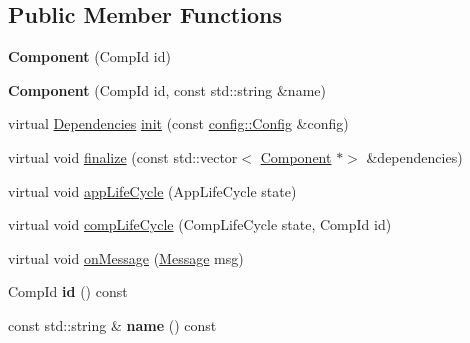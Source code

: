 \subsection*{Public Member Functions}
\begin{DoxyCompactItemize}
\item 
\mbox{\label{classtheoria_1_1core_1_1Component_a64b1e60585ad8c0d12d9be814b37dda8}} 
{\bfseries Component} (Comp\+Id id)
\item 
\mbox{\label{classtheoria_1_1core_1_1Component_a719767a45a12a3d12670aadd83f5d292}} 
{\bfseries Component} (Comp\+Id id, const std\+::string \&name)
\item 
virtual \hyperlink{classtheoria_1_1core_1_1Dependencies}{Dependencies} \hyperlink{classtheoria_1_1core_1_1Component_a7ed45f6e38442a40666ae4556f794f7d}{init} (const \hyperlink{classtheoria_1_1config_1_1Config}{config\+::\+Config} \&config)
\item 
virtual void \hyperlink{classtheoria_1_1core_1_1Component_afd8acc89e2cd36e92bebe7e6fa530764}{finalize} (const std\+::vector$<$ \hyperlink{classtheoria_1_1core_1_1Component}{Component} $\ast$$>$ \&dependencies)
\item 
virtual void \hyperlink{classtheoria_1_1core_1_1Component_ae036cde9b803a621149efeff7e0e00fc}{app\+Life\+Cycle} (App\+Life\+Cycle state)
\item 
virtual void \hyperlink{classtheoria_1_1core_1_1Component_a92578e2b6253681a21b91e7c22b22975}{comp\+Life\+Cycle} (Comp\+Life\+Cycle state, Comp\+Id id)
\item 
virtual void \hyperlink{classtheoria_1_1core_1_1Component_a94991dc5bdf509df6d35bb218e4880eb}{on\+Message} (\hyperlink{classtheoria_1_1core_1_1Message}{Message} msg)
\item 
\mbox{\label{classtheoria_1_1core_1_1Component_ab539df9f996efceda7743fa1b69cd25d}} 
Comp\+Id {\bfseries id} () const
\item 
\mbox{\label{classtheoria_1_1core_1_1Component_ae0a32f194c007fe419ec9ae9303025fc}} 
const std\+::string \& {\bfseries name} () const
\item 
\mbox{\label{classtheoria_1_1core_1_1Component_a4c741f3d65b7d50bd56378bdc9cc9a62}} 
$$
\end{DoxyCompactItemize}
